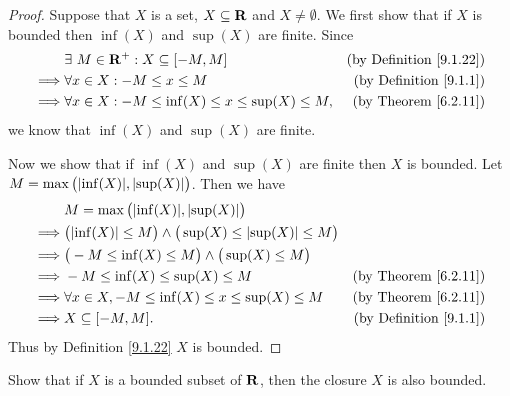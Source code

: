 \begin{proof}
    Suppose that \(X\) is a set, \(X \subseteq \mathbf{R}\) and \(X \neq \emptyset\).
    We first show that if \(X\) is bounded then \(\inf(X)\) and \(\sup(X)\) are finite.
    Since
    \begin{align*}
                 & \exists\ M \in \mathbf{R}^+ : X \subseteq [-M, M]                     & \text{(by Definition \ref{9.1.22})} \\
        \implies & \forall x \in X : -M \leq x \leq M                            & \text{(by Definition \ref{9.1.1})}  \\
        \implies & \forall x \in X : -M \leq \inf(X) \leq x \leq \sup(X) \leq M, & \text{(by Theorem \ref{6.2.11})}
    \end{align*}
    we know that \(\inf(X)\) and \(\sup(X)\) are finite.

    Now we show that if \(\inf(X)\) and \(\sup(X)\) are finite then \(X\) is bounded.
    Let \(M = \max\big(\abs{\inf(X)}, \abs{\sup(X)}\big)\).
    Then we have
    \begin{align*}
                 & M = \max\big(\abs{\inf(X)}, \abs{\sup(X)}\big)                                                                        \\
        \implies & \big(\abs{\inf(X)} \leq M\big) \land \big(\sup(X) \leq \abs{\sup(X)} \leq M\big)                                      \\
        \implies & \big(-M \leq \inf(X) \leq M\big) \land \big(\sup(X) \leq M\big)                                                       \\
        \implies & -M \leq \inf(X) \leq \sup(X) \leq M                                              & \text{(by Theorem \ref{6.2.11})}   \\
        \implies & \forall x \in X, -M \leq \inf(X) \leq x \leq \sup(X) \leq M                      & \text{(by Theorem \ref{6.2.11})}   \\
        \implies & X \subseteq [-M, M].                                                             & \text{(by Definition \ref{9.1.1})}
    \end{align*}
    Thus by Definition \ref{9.1.22} \(X\) is bounded.
\end{proof}

\begin{exercise}\label{ex 9.1.11}
    Show that if \(X\) is a bounded subset of \(\mathbf{R}\), then the closure \(X\) is also bounded.
\end{exercise}

